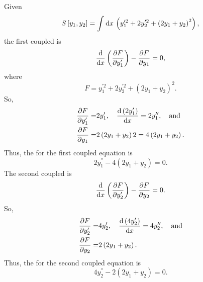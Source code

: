 \def\F{ y_1^{\prime2}  + 2y_2^{\prime2}+\left(2y_1+y_2\right)^2}%
Given
\[
	S\left[y_1,y_2\right] = \Int{}{}{x}\left( \F \right),
\]
the first coupled \el is
\[
	\ELE{F}{x}{y_{1}},
\]
where
\[
	F = \F.
\]
So,
\begin{align*}
	\pderiv{F}{y_1^\prime} =& 2y_1^\prime,\quad \deriv{\left(2y_1^\prime\right)}{x} = 2y_1^\dprime,\quad\textrm{and}\\
	\pderiv{F}{y_1}=&2\left(2y_1+y_2\right)2 = 4\left(2y_1+y_2\right).
\end{align*}
Thus, the \el for the first coupled equation is
\begin{equation}
	\label{eq:2.1}
	2y_1^\dprime - 4\left(2y_1+y_2\right) = 0.
\end{equation}
The second coupled \el is
\[
	\ELE{F}{x}{y_{2}}.
\]
So,
\begin{align*}
	\pderiv{F}{y_2^\prime} =& 4y_2^\prime,\quad \deriv{\left(4y_2^\prime\right)}{x} = 4y_2^\dprime,\quad\textrm{and}\\
	\pderiv{F}{y_2}=&2\left(2y_1+y_2\right).
\end{align*}
Thus, the \el for the second coupled equation is 
\begin{equation}
	\label{eq:2.2}
	4y_2^\dprime - 2\left(2y_1+y_2\right) = 0.
\end{equation}